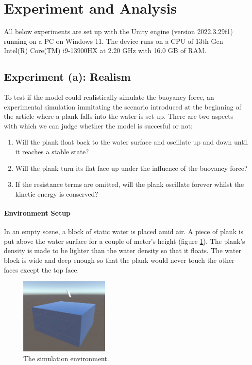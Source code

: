 \section{Experiment and Analysis}

All below experiments are set up with the Unity engine (version 2022.3.29f1) running on a PC on Windows 11.
The device runs on a CPU of 13th Gen Intel(R) Core(TM) i9-13900HX at 2.20 GHz with 16.0 GB of RAM.

\subsection{Experiment (a): Realism}

To test if the model could realistically simulate the buoyancy force, an experimental simulation immitating the scenario introduced at the beginning of the article where a plank falls into the water is set up.
There are two aspects with which we can judge whether the model is succesful or not:
\begin{enumerate}
	\item Will the plank float back to the water surface and oscillate up and down until it reaches a stable state?
	\item Will the plank turn its flat face up under the influence of the buoyancy force?
	\item If the resistance terms are omitted, will the plank oscillate forever whilst the kinetic energy is conserved?
\end{enumerate}

\paragraph*{Environment Setup}

In an empty scene, a block of static water is placed amid air.
A piece of plank is put above the water surface for a couple of meter's height (figure \ref{simulation-environment}).
The plank's density is made to be lighter than the water density so that it floats.
The water block is wide and deep enough so that the plank would never touch the other faces except the top face.

\begin{figure}[h]
	\centering
	\includegraphics[height=1.5in]{figures/experiment-environment.jpg}
	\caption{The simulation environment.}
	\label{simulation-environment}
\end{figure}

